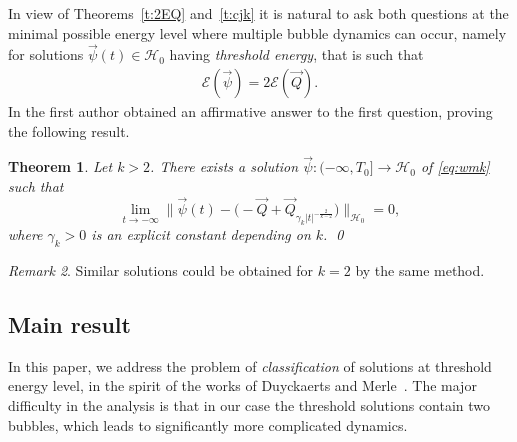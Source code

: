 \documentclass[10pt,reqno]{amsart}
\newcommand{\E}{\mathcal{E}}
\newcommand{\HH}{\mathcal{H}}
\newcommand{\EQ}[1]{\begin{equation}\begin{split} #1 \end{split}\end{equation}}
\numberwithin{equation}{section}
\newtheorem{thm}{Theorem}[section]
\theoremstyle{remark}
\newtheorem{rem}[thm]{Remark}
\newcommand{\0}{\emptyset}
\begin{document}
In view of Theorems~\ref{t:2EQ} and~\ref{t:cjk} it is natural to ask both questions at the minimal possible energy level where multiple bubble dynamics can occur, namely for solutions $\vec\psi(t) \in \HH_0$ having \emph{threshold energy}, that is such that
 \EQ{\label{eq:energy}
 \E( \vec \psi) =  2 \E(\vec Q).
  }
In \cite{JJ-AJM} the first author obtained  an affirmative answer to the first question, proving the following result. 
\begin{thm}\emph{\cite[Theorem $2$]{JJ-AJM}}
  \label{thm:deux-bulles-wmap}
Let $k > 2$. There exists a solution $\vec\psi: (-\infty, T_0] \to \HH_0$ of \eqref{eq:wmk}
such that
  \begin{equation}
    \label{eq:mainthm-wmap}
    \lim_{t\to -\infty}\big\|\vec\psi(t) - \big({-}\vec Q + \vec Q_{\gamma_k |t|^{-\frac{2}{k-2}}}\big)\big\|_{\HH_0} = 0,
  \end{equation}
  where $\gamma_k > 0$ is an explicit constant depending on $k$. \qed
\end{thm}
\begin{rem}
Similar solutions could be obtained for $k = 2$ by the same method. 
\end{rem}
 \subsection{Main result}
In this paper, we address the problem of \emph{classification} of solutions
at threshold energy level, in the spirit of the works of Duyckaerts and Merle~\cite{DM, DM-NLS}.
The major difficulty in the analysis is that in our case the threshold solutions
contain two bubbles, which leads to significantly more complicated dynamics. 
\end{document}
